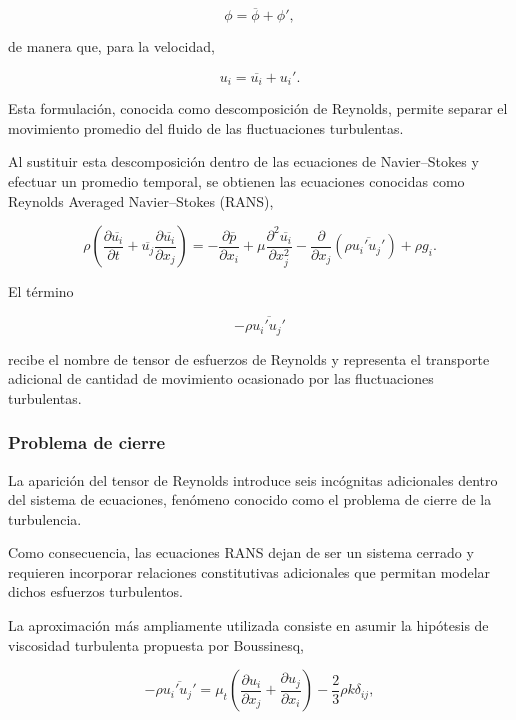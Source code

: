 \begin{equation}
\phi=\overline{\phi}+\phi',
\end{equation}

de manera que, para la velocidad,

\begin{equation}
u_i=\overline{u_i}+u_i'.
\end{equation}

Esta formulación, conocida como descomposición de Reynolds, permite separar el movimiento promedio del fluido de las fluctuaciones turbulentas.

Al sustituir esta descomposición dentro de las ecuaciones de Navier--Stokes y efectuar un promedio temporal, se obtienen las ecuaciones conocidas como Reynolds Averaged Navier--Stokes (RANS),

\begin{equation}
\rho
\left(
\frac{\partial\overline{u_i}}{\partial t}
+
\overline{u_j}
\frac{\partial\overline{u_i}}{\partial x_j}
\right)
=
-\frac{\partial\overline{p}}{\partial x_i}
+
\mu
\frac{\partial^2\overline{u_i}}
{\partial x_j^2}
-
\frac{\partial}
{\partial x_j}
\left(
\rho
\overline{u_i'u_j'}
\right)
+
\rho g_i.
\end{equation}

El término

\[
-\rho\overline{u_i'u_j'}
\]

recibe el nombre de tensor de esfuerzos de Reynolds y representa el transporte adicional de cantidad de movimiento ocasionado por las fluctuaciones turbulentas.

\subsubsection{Problema de cierre}

La aparición del tensor de Reynolds introduce seis incógnitas adicionales dentro del sistema de ecuaciones, fenómeno conocido como el problema de cierre de la turbulencia.

Como consecuencia, las ecuaciones RANS dejan de ser un sistema cerrado y requieren incorporar relaciones constitutivas adicionales que permitan modelar dichos esfuerzos turbulentos.

La aproximación más ampliamente utilizada consiste en asumir la hipótesis de viscosidad turbulenta propuesta por Boussinesq,

\begin{equation}
-\rho\overline{u_i'u_j'}
=
\mu_t
\left(
\frac{\partial u_i}{\partial x_j}
+
\frac{\partial u_j}{\partial x_i}
\right)
-
\frac{2}{3}
\rho k\delta_{ij},
\end{equation}

